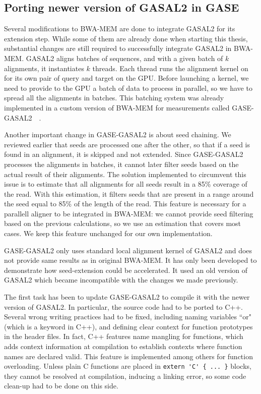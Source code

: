 \subsection{Porting newer version of GASAL2 in GASE}

Several modifications to BWA-MEM are done to integrate GASAL2 for its extension step. While some of them are already done when starting this thesis, substantial changes are still required to successfully integrate GASAL2 in BWA-MEM. 
GASAL2 aligns batches of sequences, and with a given batch of $k$ alignments, it instantiates $k$ threads. Each thread runs the alignment kernel on for its own pair of query and target on the GPU. Before launching a kernel, we need to provide to the GPU a batch of data to process in parallel, so we have to spread all the alignments in batches. This batching system was already implemented in a custom version of BWA-MEM for measurements called GASE-GASAL2~\cite{Ahmed:gase-gasal2}~\cite{Ahmed:GASE}. 

Another important change in GASE-GASAL2 is about seed chaining. We reviewed earlier that seeds are processed one after the other, so that if a seed is found in an alignment, it is skipped and not extended. Since GASE-GASAL2 processes the alignments in batches, it cannot later filter seeds based on the actual result of their alignments. The solution implemented to circumvent this issue is to estimate that all alignments for all seeds result in a 85\% coverage of the read. With this estimation, it filters seeds that are present in a range around the seed equal to 85\% of the length of the read. This feature is necessary for a parallell aligner to be integrated in BWA-MEM: we cannot provide seed filtering based on the previous calculations, so we use an estimation that covers most cases. We keep this feature unchanged for our own implementation.

GASE-GASAL2 only uses standard local alignment kernel of GASAL2 and does not provide same results as in original BWA-MEM. It has only been developed to demonstrate how seed-extension could be accelerated. It used an old version of GASAL2 which became incompatible with the changes we made previously.

The first task has been to update GASE-GASAL2 to compile it with the newer version of GASAL2. In particular, the source code had to be ported to C++. Several wrong writing practices had to be fixed, including naming variables ``or" (which is a keyword in C++), and defining clear context for function prototypes in the header files. In fact, C++ features name mangling for functions, which adds context information at compilation to establish contexts where function names are declared valid. This feature is implemented among others for function overloading. Unless plain C functions are placed in \verb|extern 'C' { ... }| blocks, they cannot be resolved at compilation, inducing a linking error, so some code clean-up had to be done on this side.